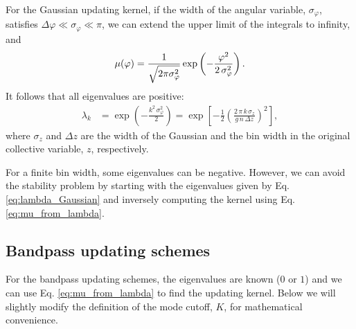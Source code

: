 \documentclass[reprint, superscriptaddress, floatfix]{revtex4-1}
\begin{document}
For the Gaussian updating kernel,
if the width of the angular variable, $\sigma_\varphi$,
satisfies $\Delta \varphi \ll \sigma_\varphi \ll \pi$,
we can extend
the upper limit of the integrals
to infinity, and
%
\begin{equation}
  \mu(\varphi)
  =
  \frac{            1            }
       { \sqrt{ 2 \pi \sigma_\varphi^2 } }
  \exp\left(
        -\frac{   \varphi^2   }
              { 2 \, \sigma_\varphi^2 }
      \right)
  .
\notag
\end{equation}
%
%
It follows that all eigenvalues are positive\cite{bussi2006}:
%
\begin{align}
  \lambda_k
  &=
  \exp\left(
        -\frac{ k^2 \, \sigma_\varphi^2 }
              {           2             }
      \right)
  =
  \exp\left[
        -\frac 1 2
        \left(
         \frac{ 2 \, \pi \, k \, \sigma_z }
              { g \, n \, \Delta z  }
        \right)^2
      \right]
  ,
\label{eq:lambda_Gaussian}
\end{align}
where $\sigma_z$ and $\Delta z$
are the width of the Gaussian
and the bin width
in the original collective variable, $z$,
respectively.


For a finite bin width,
some eigenvalues can be negative.
However, we can avoid the stability problem
by starting with the eigenvalues given by Eq. \eqref{eq:lambda_Gaussian}
and inversely computing the kernel using Eq. \eqref{eq:mu_from_lambda}.



\subsection{\label{sec:homo_bandpass}
Bandpass updating schemes}



For the bandpass updating schemes,
the eigenvalues are known ($0$ or $1$) and
we can use Eq. \eqref{eq:mu_from_lambda}
to find the updating kernel.
%
Below we will slightly modify the definition of
the mode cutoff, $K$,
for mathematical convenience.
\end{document}
